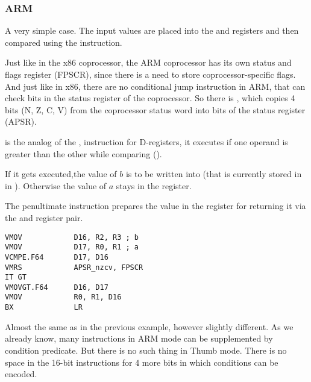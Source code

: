 \subsubsection{ARM}

\myparagraph{\OptimizingXcodeIV (\ARMMode)}



A very simple case.
The input values are placed into the  and  registers and then compared using the  instruction.

Just like in the x86 coprocessor, the ARM coprocessor has its own status and flags register (\ac{FPSCR}),
since there is a need to store coprocessor-specific flags.
And just like in x86, there are no conditional jump instruction in ARM, 
that can check bits in the status register of the coprocessor. 
So there is , which copies 4 bits (N, Z, C, V) from the coprocessor status word into bits of the  status register (\ac{APSR}).

 is the analog of the , 
instruction for D-registers, it executes if one operand is greater than the other while comparing (). 

If it gets executed,the value of $b$ is to be written into  (that is currently stored in in ).
Otherwise the value of $a$ stays in the  register.


The penultimate instruction  prepares the value in the  register for returning it via the  and 
register pair.

\myparagraph{\OptimizingXcodeIV (\ThumbTwoMode)}

\begin{lstlisting}[caption=\OptimizingXcodeIV (\ThumbTwoMode)]
VMOV            D16, R2, R3 ; b
VMOV            D17, R0, R1 ; a
VCMPE.F64       D17, D16
VMRS            APSR_nzcv, FPSCR
IT GT 
VMOVGT.F64      D16, D17
VMOV            R0, R1, D16
BX              LR
\end{lstlisting}

Almost the same as in the previous example, however slightly different.
As we already know, many instructions in ARM mode can be supplemented by condition predicate.
But there is no such thing in Thumb mode. 
There is no space in the 16-bit instructions for 4 more bits in which conditions can be encoded.

